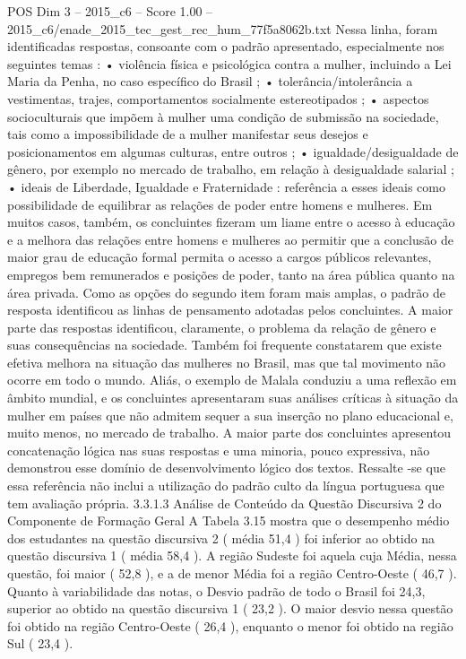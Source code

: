 \begin{textsample}{POS Dim 3 – 2015\_c6 – Score 1.00 – 2015\_c6/enade\_2015\_tec\_gest\_rec\_hum\_77f5a8062b.txt}
Nessa linha, foram identificadas respostas, consoante com o padrão apresentado, especialmente nos seguintes temas : • violência física e psicológica contra a mulher, incluindo a Lei Maria da Penha, no caso específico do Brasil ; • tolerância/intolerância a vestimentas, trajes, comportamentos socialmente estereotipados ; • aspectos socioculturais que impõem à mulher uma condição de submissão na sociedade, tais como a impossibilidade de a mulher manifestar seus desejos e posicionamentos em algumas culturas, entre outros ; • igualdade/desigualdade de gênero, por exemplo no mercado de trabalho, em relação à desigualdade salarial ; • ideais de Liberdade, Igualdade e Fraternidade : referência a esses ideais como possibilidade de equilibrar as relações de poder entre homens e mulheres.
Em muitos casos, também, os concluintes fizeram um liame entre o acesso à educação e a melhora das relações entre homens e mulheres ao permitir que a conclusão de maior grau de educação formal permita o acesso a cargos públicos relevantes, empregos bem remunerados e posições de poder, tanto na área pública quanto na área privada.
Como as opções do segundo item foram mais amplas, o padrão de resposta identificou as linhas de pensamento adotadas pelos concluintes.
A maior parte das respostas identificou, claramente, o problema da relação de gênero e suas consequências na sociedade.
Também foi frequente constatarem que existe efetiva melhora na situação das mulheres no Brasil, mas que tal movimento não ocorre em todo o mundo.
Aliás, o exemplo de Malala conduziu a uma reflexão em âmbito mundial, e os concluintes apresentaram suas análises críticas à situação da mulher em países que não admitem sequer a sua inserção no plano educacional e, muito menos, no mercado de trabalho.
A maior parte dos concluintes apresentou concatenação lógica nas suas respostas e uma minoria, pouco expressiva, não demonstrou esse domínio de desenvolvimento lógico dos textos.
Ressalte -se que essa referência não inclui a utilização do padrão culto da língua portuguesa que tem avaliação própria. 3.3.1.3 Análise de Conteúdo da Questão Discursiva 2 do Componente de Formação Geral A Tabela 3.15 mostra que o desempenho médio dos estudantes na questão discursiva 2 ( média 51,4 ) foi inferior ao obtido na questão discursiva 1 ( média 58,4 ).
A região Sudeste foi aquela cuja Média, nessa questão, foi maior ( 52,8 ), e a de menor Média foi a região Centro-Oeste ( 46,7 ).
Quanto à variabilidade das notas, o Desvio padrão de todo o Brasil foi 24,3, superior ao obtido na questão discursiva 1 ( 23,2 ).
O maior desvio nessa questão foi obtido na região Centro-Oeste ( 26,4 ), enquanto o menor foi obtido na região Sul ( 23,4 ).

\end{textsample}
